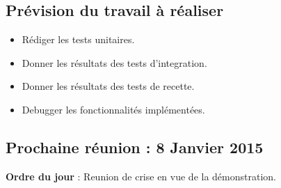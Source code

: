 \documentclass[12pt,a4paper]{article}
\begin{document}
\subsection*{Prévision du travail à réaliser}

\begin{itemize}[label = $\blacktriangleright$]
\item Rédiger les tests unitaires.

\item Donner les résultats des tests d'integration.

\item Donner les résultats des tests de recette.

\item Debugger les fonctionnalités implémentées.
\end{itemize}

\subsection*{Prochaine réunion : 8 Janvier 2015}

\textbf{Ordre du jour} : Reunion de crise en vue de la démonstration.\\
\end{document}
